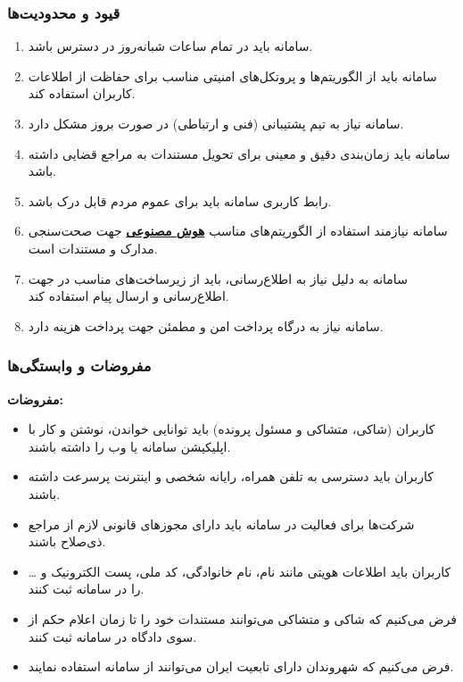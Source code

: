 \documentclass[12pt,a4paper,oneside]{article}
\begin{document}
			\subsubsection{قیود و محدودیت‌ها}
			\begin{enumerate}
				\renewcommand{\labelenumi}{\textbf{.C\arabic{enumi}}}
				\item 
				سامانه باید در تمام ساعات شبانه‌روز در دسترس باشد.
			
				\item 
				سامانه باید از الگوریتم‌ها و پروتکل‌های امنیتی مناسب برای حفاظت از اطلاعات کاربران استفاده کند.
			
				\item 
				سامانه نیاز به تیم پشتیبانی (فنی و ارتباطی) در صورت بروز مشکل دارد.
			
				\item 
				سامانه باید زمان‌بندی دقیق و معینی برای تحویل مستندات به مراجع قضایی داشته باشد.
			
				\item 
				رابط کاربری سامانه باید برای عموم مردم قابل درک باشد.
			
				\item 
				سامانه نیازمند استفاده از الگوریتم‌های مناسب 
				\hyperref[ref:ai]{\textbf{هوش مصنوعی}}
				جهت صحت‌سنجی مدارک و مستندات است.
			
				\item 
				سامانه به دلیل نیاز به اطلاع‌رسانی، باید از زیرساخت‌های مناسب در جهت اطلاع‌رسانی و ارسال پیام استفاده کند.
			
				\item 
				سامانه نیاز به درگاه پرداخت امن و مطمئن جهت پرداخت هزینه دارد.
			\end{enumerate}
			
			\subsubsection{مفروضات و وابستگی‌ها}

			\textbf{مفروضات:}
			\begin{itemize}
				\item 
				کاربران (شاکی، متشاکی و مسئول پرونده) باید توانایی خواندن، نوشتن و کار با اپلیکیشن سامانه یا وب را داشته باشند.
			
				\item 
				کاربران باید دسترسی به تلفن همراه، رایانه شخصی و اینترنت پرسرعت داشته باشند.
			
				\item 
				شرکت‌ها برای فعالیت در سامانه باید دارای مجوزهای قانونی لازم از مراجع ذی‌صلاح باشند.
			
				\item 
				کاربران باید اطلاعات هویتی مانند نام، نام خانوادگی، کد ملی، پست الکترونیک و … را در سامانه ثبت کنند.
			
				\item 
				فرض می‌کنیم که شاکی و متشاکی می‌توانند مستندات خود را تا زمان اعلام حکم از سوی دادگاه در سامانه ثبت کنند.
			
				\item 
				فرض می‌کنیم که شهروندان دارای تابعیت ایران می‌توانند از سامانه استفاده نمایند.
			\end{itemize}
			
\end{document}
